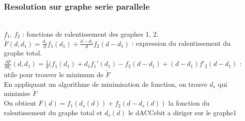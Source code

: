 \documentclass{beamer}
\begin{document}
\begin{frame}
    \frametitle{Resolution sur graphe serie parallele}
    \\
    $f_1$, $f_2$ : fonctions de ralentissement des graphes 1, 2.\\
    $\widetilde{F}(d,d_1) = \frac{d_1}{d}f_1(d_1)+\frac{d-d_1}{d}f_2(d-d_1)$ : expression du ralentissement 
    du graphe total.\\
    $\frac{\partial \widetilde{F}}{\partial d_1}(d,d_1) = \frac{1}{d}(f_1(d_1) + d_1 f_1'(d_1) - f_2(d-d_1) + (d-d_1)f'_2(d-d_1)$
    : utile pour trouver le minimum de $\widetilde{F}$\\
    En appliquant un algorithme de minimisation de fonction, on trouve $d_s$ qui
    minimise $\widetilde{F}$\\
    On obtient $F(d)=f_1(d_s(d))+f_2(d-d_s(d))$ la fonction du ralentissement du
    graphe total et $d_s(d)$ le dACCebit a diriger sur le graphe1\\
\end{frame}
\end{document}

